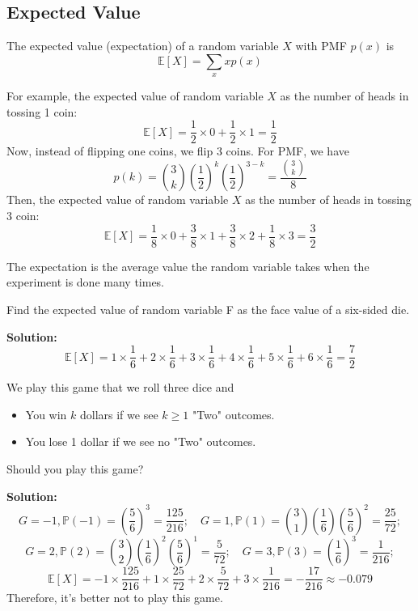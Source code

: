 \subsection{Expected Value}
\begin{definition}
  The expected value (expectation) of a random variable \(X\) with PMF \(p(x)\) is 
  \[
    \mathbb{E}[X] = \sum_{x} xp(x)
  \]
\end{definition}

For example, the expected value of random variable \(X\) as the number of heads in tossing 1 coin:
\[
  \mathbb{E}[X] = \dfrac{1}{2} \times 0 + \dfrac{1}{2} \times 1 = \dfrac{1}{2}
\]
Now, instead of flipping one coins, we flip 3 coins. For PMF, we have 
\[
  p(k) = \binom{3}{k} (\dfrac{1}{2})^k (\dfrac{1}{2})^{3-k} = \dfrac{\binom{3}{k}}{8}
\]
Then, the expected value of random variable \(X\) as the number of heads in tossing 3 coin:
\[
  \mathbb{E}[X] = \dfrac{1}{8} \times 0 + \dfrac{3}{8} \times 1 + \dfrac{3}{8} \times 2 + \dfrac{1}{8} \times 3 = \dfrac{3}{2}
\]

The expectation is the average value the random variable takes when the experiment is done many times.

\begin{eg}
  Find the expected value of random variable F as the face value of a six-sided die. 

  \textbf{Solution:} 
  \[
    \mathbb{E}[X] = 1 \times \dfrac{1}{6} + 2 \times \dfrac{1}{6} + 3 \times \dfrac{1}{6} + 4 \times \dfrac{1}{6} + 5 \times \dfrac{1}{6} + 6 \times \dfrac{1}{6} = \dfrac{7}{2}
  \]
\end{eg}

\begin{eg}
  We play this game that we roll three dice and 
  \begin{itemize}
    \item You win \(k\) dollars if we see \(k \geq 1\) "Two" outcomes.
    \item You lose 1 dollar if we see no "Two" outcomes.
  \end{itemize}
  Should you play this game?

  \textbf{Solution:}
  \[
    G = -1, \mathbb{P}(-1) = (\dfrac{5}{6})^3 = \dfrac{125}{216};\quad G = 1, \mathbb{P}(1) = \binom{3}{1}(\dfrac{1}{6})(\dfrac{5}{6})^2 = \dfrac{25}{72};
  \]
  \[
    G = 2, \mathbb{P}(2) = \binom{3}{2}(\dfrac{1}{6})^2(\dfrac{5}{6})^1 = \dfrac{5}{72};\quad G = 3, \mathbb{P}(3) = (\dfrac{1}{6})^3 = \dfrac{1}{216};
  \]
  \[
    \mathbb{E}[X] = -1 \times \dfrac{125}{216} + 1 \times \dfrac{25}{72} + 2 \times \dfrac{5}{72} + 3 \times \dfrac{1}{216} = - \dfrac{17}{216} \approx -0.079
  \]
  Therefore, it’s better not to play this game. 
\end{eg}

